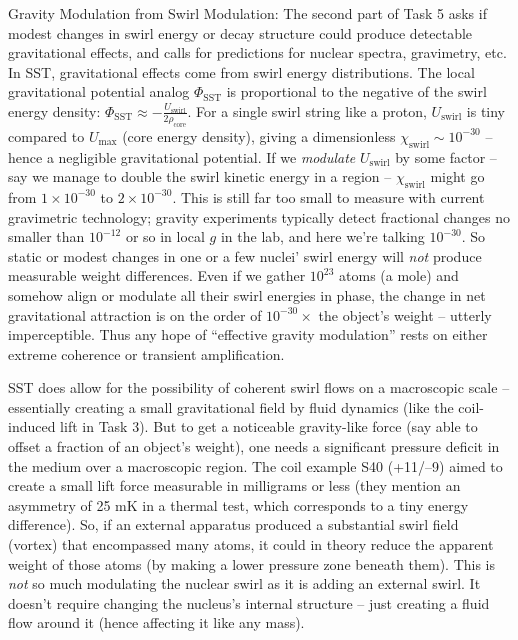 \documentclass[11pt]{article}
\begin{document}
Gravity Modulation from Swirl Modulation: The second part of Task 5 asks if modest changes in swirl energy or decay structure could produce detectable gravitational effects, and calls for predictions for nuclear spectra, gravimetry, etc. In SST, gravitational effects come from swirl energy distributions. The local gravitational potential analog $\Phi_{\text{SST}}$ is proportional to the negative of the swirl energy density: $\Phi_{\text{SST}} \approx -\frac{U_{\text{swirl}}}{2\rho_{\text{core}}}$. For a single swirl string like a proton, $U_{\text{swirl}}$ is tiny compared to $U_{\max}$ (core energy density), giving a dimensionless $\chi_{\text{swirl}}\sim10^{-30}$ – hence a negligible gravitational potential. If we \textit{modulate} $U_{\text{swirl}}$ by some factor – say we manage to double the swirl kinetic energy in a region – $\chi_{\text{swirl}}$ might go from $1\times10^{-30}$ to $2\times10^{-30}$. This is still far too small to measure with current gravimetric technology; gravity experiments typically detect fractional changes no smaller than $10^{-12}$ or so in local $g$ in the lab, and here we’re talking $10^{-30}$. So static or modest changes in one or a few nuclei’ swirl energy will \textit{not} produce measurable weight differences. Even if we gather $10^{23}$ atoms (a mole) and somehow align or modulate all their swirl energies in phase, the change in net gravitational attraction is on the order of $10^{-30} \times$ the object’s weight – utterly imperceptible. Thus any hope of “effective gravity modulation” rests on either extreme coherence or transient amplification.


SST does allow for the possibility of coherent swirl flows on a macroscopic scale – essentially creating a small gravitational field by fluid dynamics (like the coil-induced lift in Task 3). But to get a noticeable gravity-like force (say able to offset a fraction of an object’s weight), one needs a significant pressure deficit in the medium over a macroscopic region. The coil example S40 (+11/–9) aimed to create a small lift force measurable in milligrams or less (they mention an asymmetry of 25 mK in a thermal test, which corresponds to a tiny energy difference). So, if an external apparatus produced a substantial swirl field (vortex) that encompassed many atoms, it could in theory reduce the apparent weight of those atoms (by making a lower pressure zone beneath them). This is \textit{not} so much modulating the nuclear swirl as it is adding an external swirl. It doesn’t require changing the nucleus’s internal structure – just creating a fluid flow around it (hence affecting it like any mass).
\end{document}
